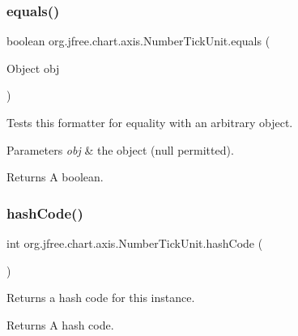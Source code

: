 \subsubsection{\texorpdfstring{equals()}{equals()}}
{\footnotesize\ttfamily boolean org.\+jfree.\+chart.\+axis.\+Number\+Tick\+Unit.\+equals (\begin{DoxyParamCaption}\item[{Object}]{obj }\end{DoxyParamCaption})}

Tests this formatter for equality with an arbitrary object.


\begin{DoxyParams}{Parameters}
{\em obj} & the object ({\ttfamily null} permitted).\\
\hline
\end{DoxyParams}
\begin{DoxyReturn}{Returns}
A boolean. 
\end{DoxyReturn}
\mbox{\label{classorg_1_1jfree_1_1chart_1_1axis_1_1_number_tick_unit_aaed60906ec9dd8fe843cdf042e3da79d}} 
\subsubsection{\texorpdfstring{hash\+Code()}{hashCode()}}
{\footnotesize\ttfamily int org.\+jfree.\+chart.\+axis.\+Number\+Tick\+Unit.\+hash\+Code (\begin{DoxyParamCaption}{ }\end{DoxyParamCaption})}

Returns a hash code for this instance.

\begin{DoxyReturn}{Returns}
A hash code. 
\end{DoxyReturn}
\mbox{\label{classorg_1_1jfree_1_1chart_1_1axis_1_1_number_tick_unit_a7ac046ae8c0346f54b309c05fb99c82f}} 
